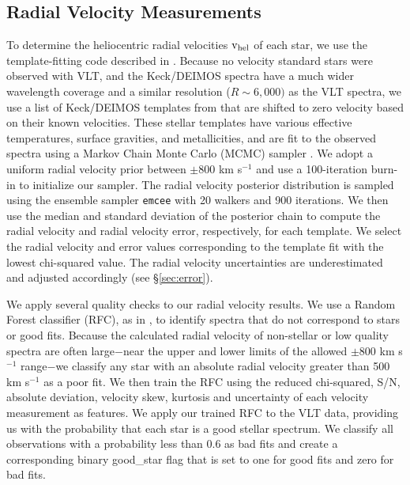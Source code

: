 \documentclass[twocolumn]{aastex63}
\newcommand{\code}[1]{\texttt{#1}\xspace}
\newcommand{\revise}[1]{#1}
\begin{document}
\subsection{Radial Velocity Measurements}
\label{sec:rv}
To determine the heliocentric radial velocities $\rm v_{hel}$ of each star, we use the template-fitting code described in \citet{li2017}. Because no velocity standard stars were observed with VLT, and the Keck/DEIMOS spectra have a much wider wavelength coverage and a similar resolution ($R\sim6,000)$ as the VLT spectra, we use a list of Keck/DEIMOS templates from \citet{kir2015} \revise{that are shifted to zero velocity based on their known velocities. These stellar templates have various effective temperatures, surface gravities, and metallicities, and are fit to the observed spectra using a Markov Chain Monte Carlo (MCMC) sampler \citep{for2013}. }
We adopt a uniform radial velocity prior between $\pm$800 km s$^{-1}$ and use a 100-iteration burn-in to initialize our sampler. The radial velocity posterior distribution is sampled using the ensemble sampler \code{emcee} with 20 walkers and 900 iterations. We then use the median and standard deviation of the posterior chain to compute the radial velocity and radial velocity error, respectively, for each template. We select the radial velocity and error values corresponding to the template fit with the lowest chi-squared value. The radial velocity uncertainties are underestimated and adjusted accordingly (see \S\ref{sec:error}).

We apply several quality checks to our radial velocity results. We use a Random Forest classifier (RFC), as in \citet{li2019}, to identify spectra that do not correspond to stars or good fits. Because the calculated radial velocity of non-stellar or low quality spectra are often large$-$near the upper and lower limits of the allowed $\pm$800 km s$^{-1}$ range$-$we classify any star with an absolute radial velocity greater than 500 km s$^{-1}$ as a poor fit. We then train the RFC using the reduced chi-squared, S/N, absolute deviation, velocity skew, kurtosis and uncertainty of each velocity measurement as features. We apply our trained RFC to the VLT data, providing us with the probability that each star is a good stellar spectrum. We classify all observations with a probability less than 0.6 as bad fits and create a corresponding binary good\_star flag that is set to one for good fits and zero for bad fits.
\end{document}
